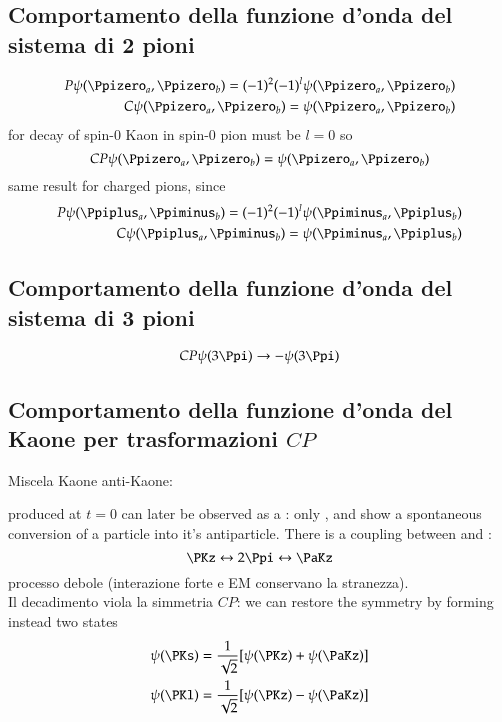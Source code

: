 \documentclass[main.tex]{subfiles}
\begin{document}
\subsection{Comportamento della funzione d'onda del sistema di 2 pioni}
\begin{align*}
P\psi(\Ppizero_a,\Ppizero_b)=(-1)^2(-1)^l\psi(\Ppizero_a,\Ppizero_b)\\
C\psi(\Ppizero_a,\Ppizero_b)=\psi(\Ppizero_a,\Ppizero_b)\\
\end{align*}
for decay of spin-0 Kaon in spin-0 pion must be $l=0$ so
\begin{equation*}
CP\psi(\Ppizero_a,\Ppizero_b)=\psi(\Ppizero_a,\Ppizero_b)\\
\end{equation*}
same result for charged pions, since
\begin{align*}
P\psi(\Ppiplus_a,\Ppiminus_b)=(-1)^2(-1)^l\psi(\Ppiminus_a,\Ppiplus_b)\\
C\psi(\Ppiplus_a,\Ppiminus_b)=\psi(\Ppiminus_a,\Ppiplus_b)
\end{align*}

\subsection{Comportamento della funzione d'onda del sistema di 3 pioni}
\begin{equation*}
CP\psi(3\Ppi)\rightarrow-\psi(3\Ppi)
\end{equation*}

\subsection{Comportamento della funzione d'onda del Kaone per trasformazioni $CP$}

Miscela Kaone anti-Kaone:

\PKz produced at $t=0$ can later be observed as a \PaKz: only \PKz, \PDz and \PBz show a spontaneous conversion of a particle into it's antiparticle. There is a coupling between \PKz and \PaKz:
\begin{equation*}
\PKz\leftrightarrow2\Ppi\leftrightarrow\PaKz
\end{equation*}
processo debole (interazione forte e EM conservano la stranezza).\\
Il decadimento  viola la simmetria $CP$: we can restore the symmetry by forming instead two states
\begin{align*}
\psi(\PKs)=\frac{1}{\sqrt{2}}[\psi(\PKz)+\psi(\PaKz)]\\
\psi(\PKl)=\frac{1}{\sqrt{2}}[\psi(\PKz)-\psi(\PaKz)]
\end{align*}
\end{document}
